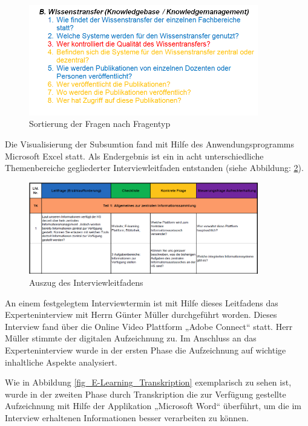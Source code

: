 \begin{figure}[h!]
	\centering
	\includegraphics[width=10cm]{kapitel/gruppe2/bilder/sortierung_fragentyp}
	\caption{Sortierung der Fragen nach Fragentyp}
	\label{fig_sortierung_fragentyp}
\end{figure}

Die Visualisierung der Subsumtion fand mit Hilfe des Anwendungsprogramms Microsoft Excel statt. Als Endergebnis ist ein in acht unterschiedliche Themenbereiche gegliederter Interviewleitfaden entstanden (siehe Abbildung: \ref{fig_auszug_interviewleitfaden}).

\begin{figure}[h!]
	\centering
	\includegraphics[width=10cm]{kapitel/gruppe2/bilder/auszug_leitfaden}
	\caption{Auszug des Interviewleitfadens}
	\label{fig_auszug_interviewleitfaden}
\end{figure}

An einem festgelegtem Interviewtermin ist mit Hilfe dieses Leitfadens das Experteninterview mit Herrn Günter Müller durchgeführt worden. Dieses Interview fand über die Online Video Plattform „Adobe Connect“ statt. Herr Müller stimmte der digitalen Aufzeichnung zu. Im Anschluss an das Experteninterview wurde in der ersten Phase die Aufzeichnung auf wichtige inhaltliche Aspekte analysiert. 

Wie in Abbildung \ref{fig_E-Learning_Transkription} exemplarisch zu sehen ist, wurde in der zweiten Phase durch Transkription die zur Verfügung gestellte Aufzeichnung mit Hilfe der Applikation „Microsoft Word“ überführt, um die im Interview erhaltenen Informationen besser verarbeiten zu können.


